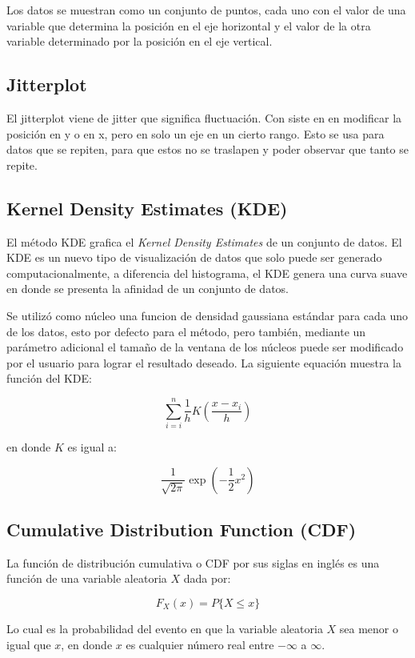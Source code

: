 \documentclass[a4paper,titlepage]{article}
\begin{document}
Los datos se muestran como un conjunto de puntos, cada uno con el valor de una 
variable que determina la posición en el eje horizontal y el valor de la otra 
variable determinado por la posición en el eje vertical.

\subsection{Jitterplot}
El jitterplot viene de jitter que significa fluctuación. Con siste en en modificar 
la posición en y o en x, pero en solo un eje en un cierto rango. Esto se usa para 
datos que se repiten, para que estos no se traslapen y poder observar que tanto se repite.

\subsection{Kernel Density Estimates (KDE)}

El método KDE grafica el \textit{Kernel Density Estimates} de un conjunto de datos. El 
KDE es un nuevo tipo de visualización de datos que solo puede ser generado 
computacionalmente, a diferencia del histograma, el KDE genera una curva suave en donde 
se presenta la afinidad de un conjunto de datos.

Se utilizó como núcleo una funcion de densidad gaussiana estándar para cada uno de los 
datos, esto por defecto para el método, pero también, mediante un parámetro 
adicional el tamaño de la ventana de los núcleos puede ser modificado por el 
usuario para lograr el resultado deseado. La siguiente equación muestra la función del KDE:

$$\sum_{i=i}^n{\frac{1}{h}K \left( \frac{x-x_i}{h} \right)}$$

en donde $K$ es igual a:

$$ \frac{1}{\sqrt{2 \pi}} \exp{ \left( - \frac{1}{2}x^2 \right)} $$

\subsection{Cumulative Distribution Function (CDF)}

La función de distribución cumulativa o CDF por sus siglas en inglés es una 
función de una variable aleatoria $X$ dada por:

$$ F_X(x) = P\{X \le x\} $$

Lo cual es la probabilidad del evento en que la variable aleatoria $X$ sea menor o 
igual que $x$, en donde  $x$ es cualquier número real entre $-\infty$ a $\infty$. 
\end{document}

